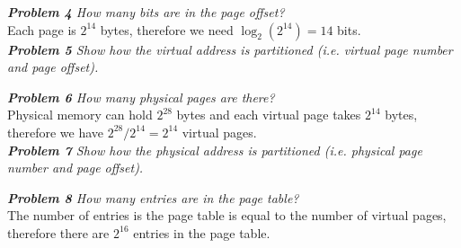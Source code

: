 \documentclass[12pt]{article}
\theoremstyle{remark}
\begin{document}
\textit{\textbf{Problem 4} How many bits are in the page offset?} \\

Each page is $2^{14}$ bytes, therefore we need $\log_2(2^{14}) = 14$ bits. \\

\textit{\textbf{Problem 5} Show how the virtual address is partitioned (i.e. virtual page number and page offset).} 

\begin{center}
\end{center}
 
\textit{\textbf{Problem 6} How many physical pages are there?} \\

Physical memory can hold $2^{28}$ bytes and each virtual page takes $2^{14}$ bytes, therefore we have $2^{28}/2^{14} = 2^{14}$ virtual pages. \\ 

\textit{\textbf{Problem 7} Show how the physical address is partitioned (i.e. physical page number and page offset).}

\begin{center}
\end{center}

\textit{\textbf{Problem 8} How many entries are in the page table?} \\

The number of entries is the page table is equal to the number of virtual pages, therefore there are $2^{16}$ entries in the page table. \\
\end{document}
